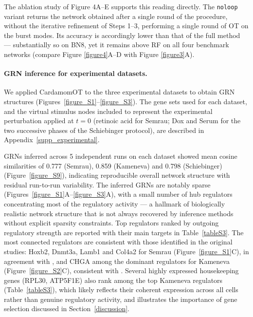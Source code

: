 \documentclass[a4paper, 11pt]{article}
\theoremstyle{plain}
\theoremstyle{remark}
\newcommand*{\firstreview}[1]{{\color{black}#1}}
\begin{document}
The ablation study of Figure 4A–E supports this reading directly. The \texttt{noloop} variant returns the network obtained after a single round of the procedure, without the iterative refinement of Steps 1–3, performing a single round of OT on the burst modes. Its accuracy is accordingly lower than that of the full method — substantially so on BN8, yet it remains above RF on all four benchmark networks (compare Figure \ref{figure4}A–D with Figure \ref{figure3}A).

\paragraph{GRN inference for experimental datasets.}
We applied CardamomOT to the three experimental datasets to obtain GRN structures
(Figures~\ref{figure_S1}--\ref{figure_S3}). The gene sets used for each dataset, and the virtual
stimulus nodes included to represent the experimental perturbation applied at $t=0$ (retinoic
acid for Semrau; Dox and Serum for the two successive phases of the Schiebinger protocol), are
described in Appendix~\ref{supp_experimental}.

\firstreview{GRNs inferred across 5 independent runs on each dataset showed mean cosine
similarities of 0.777 (Semrau), 0.859 (Kameneva) and 0.798 (Schiebinger)
(Figure~\ref{figure_S9}), indicating reproducible overall network structure with residual
run-to-run variability.} The inferred GRNs are notably sparse
(Figures~\ref{figure_S1}A--\ref{figure_S3}A), with a small number of hub regulators
concentrating most of the regulatory activity --- a hallmark of biologically realistic network
structure \cite{Grotewold2018, sanguinetti2019gene} that is not always recovered by inference
methods without explicit sparsity constraints. \firstreview{Top regulators ranked by outgoing
regulatory strength are reported with their main targets in Table~\ref{tableS3}.} The most
connected regulators are consistent with those identified in the original studies: Hoxb2,
Dnmt3a, Lamb1 and Col4a2 for Semrau (Figure~\ref{figure_S1}C), in agreement with \cite{Semrau_2017},
and CHGA among the dominant regulators for Kameneva (Figure~\ref{figure_S2}C), consistent with
\cite{gandrillon2025inferring}. \firstreview{Several highly expressed housekeeping genes (RPL30,
ATP5F1E) also rank among the top Kameneva regulators (Table~\ref{tableS3}), which likely
reflects their coherent expression across all cells rather than genuine regulatory activity, and
illustrates the importance of gene selection discussed in Section~\ref{discussion}.}
\end{document}
